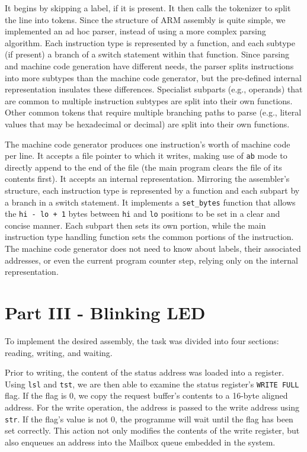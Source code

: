\documentclass[11pt]{article}
\begin{document}
It begins by skipping a label, if it is present. It then calls the tokenizer to split the line into tokens. Since the structure of ARM assembly is quite simple, we implemented an ad hoc parser, instead of using a more complex parsing algorithm. Each instruction type is represented by a function, and each subtype (if present) a branch of a switch statement within that function. Since parsing and machine code generation have different needs, the parser splits instructions into more subtypes than the machine code generator, but the pre-defined internal representation insulates these differences. Specialist subparts (e.g., operands) that are common to multiple instruction subtypes are split into their own functions. Other common tokens that require multiple branching paths to parse (e.g., literal values that may be hexadecimal or decimal) are split into their own functions.

The machine code generator produces one instruction's worth of machine code per line. It accepts a file pointer to which it writes, making use of \verb|ab| mode to directly append to the end of the file (the main program clears the file of its contents first). It accepts an internal representation. Mirroring the assembler's structure, each instruction type is represented by a function and each subpart by a branch in a switch statement. It implements a \verb|set_bytes| function that allows the \verb|hi - lo + 1| bytes between \verb|hi| and \verb|lo| positions to be set in a clear and concise manner. Each subpart then sets its own portion, while the main instruction type handling function sets the common portions of the instruction. The machine code generator does not need to know about labels, their associated addresses, or even the current program counter step, relying only on the internal representation.

\section{Part III - Blinking LED}

To implement the desired assembly, the task was divided into four sections: reading, writing, and waiting.

Prior to writing, the content of the status address was loaded into a register. Using \verb|lsl| and \verb|tst|, we are then able to examine the status register's \verb|WRITE FULL| flag. If the flag is 0, we copy the request buffer's contents to a 16-byte aligned address. For the write operation, the address is passed to the write address using \verb|str|. If the flag's value is not 0, the programme will wait until the flag has been set correctly. This action not only modifies the contents of the write register, but also enqueues an address into the Mailbox queue embedded in the system.
\end{document}
